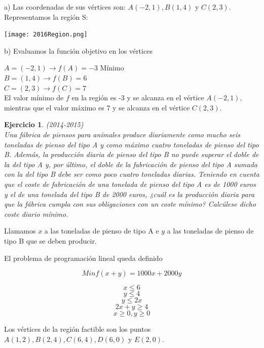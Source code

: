 \documentclass[12pt, a4paper]{amsart}
\newtheorem{ejer}{Ejercicio}
\newcommand{\s}{\color[rgb]{0,0,0.5}}
\newcommand{\n}{\color[rgb]{0,0,0}}
\begin{document}
a) 
Las coordenadas de sus vértices son: $A(-2,1), B(1,4)$ y $C(2,3).$\\
Representamos la región S:

\begin{center}
\texttt{[image: 2016Region.png]}
\end{center}




b) Evaluamos la función objetivo en los vértices
 
$A=(-2,1) \rightarrow f(A)=-3$ Mínimo\\

$B=(1,4) \rightarrow f(B)=6$\\

$C=(2,3) \rightarrow f(C)=7$\\


El valor mínimo de $f$ en la región es -3 y se alcanza en el vértice $A(-2,1),$ mientras que el valor máximo es 7 y se alcanza en el vértice $C(2,3).$




\n

\begin{ejer}\em (2014-2015)\\
Una fábrica de piensos para animales produce diariamente como mucho seis toneladas de pienso del tipo A y como máximo cuatro toneladas de pienso del tipo B. Además, la producción diaria de pienso del tipo B no puede superar el doble de la del tipo A y, por último, el doble de la fabricación de pienso del tipo A sumada con la del tipo B debe ser como poco cuatro toneladas diarias. Teniendo en cuenta que el coste de fabricación de una tonelada de pienso del tipo A es de 1000 euros y el de una tonelada del tipo B de 2000 euros, ¿cuál es la producción diaria para que la fábrica cumpla con sus obligaciones con un coste mínimo? Calcúlese dicho coste diario mínimo.
\end{ejer}
\s
Llamamos $x$ a las toneladas de pienso de tipo A e $y$ a las toneladas de pienso de tipo B que se deben producir.

El problema de programación lineal queda definido

\[Min f(x+y)=1000x+2000y\]

\[x\leqslant 6\]
\[y\leqslant 4\]
\[y\leqslant 2x\]
\[2x+y\geqslant 4\]
\[x\geqslant 0, y\geqslant 0\]

\vspace*{1cm}

Los vértices de la región factible son los puntos $A(1,2), B(2,4), C(6,4), D(6,0)$ y $E(2,0).$
\end{document}
